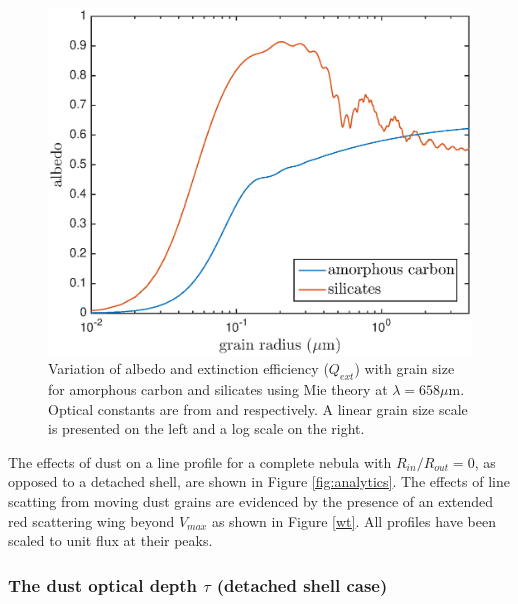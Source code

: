 \documentclass[useAMS,usenatbib,usegraphicx]{mnras}
\begin{document}
\begin{figure}
\begin{center}
\includegraphics[trim =37 10 45 15,clip=true,scale=0.51]{albedo_grainsize_upto4_log}
\caption{Variation of albedo and extinction efficiency ($Q_{ext}$) with grain size for amorphous carbon and silicates using Mie theory at $\lambda = 658 \mu $m. Optical constants are from \citet{Zubko1996} and \citet{Draine1984} respectively. A linear grain size scale is presented on the left and a log scale on the right.}
\label{albedo_grain}
\end{center}
\end{figure}

The effects of dust on a line profile for a complete nebula with $R_{in}/R_{out}=0$, as opposed 
to a detached shell, are shown in Figure \ref{fig:analytics}.  
The effects of line scatting from moving dust grains are evidenced 
by the presence of an extended red scattering wing beyond $V_{max}$ as shown in Figure \ref{wt}. 
All profiles have been scaled to unit flux at their peaks.



\subsubsection{The dust optical depth $\tau$ (detached shell case)}
\label{tau}
\end{document}
